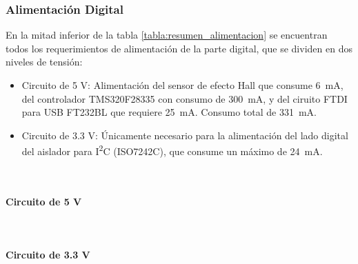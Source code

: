 \subsubsection{Alimentación Digital}

En la mitad inferior de la tabla \ref{tabla:resumen_alimentacion} se encuentran todos los requerimientos de alimentación de la parte digital, que se dividen en dos niveles de tensión:\\

\begin{itemize}
    \item {\SemiBold Circuito de 5 V:} Alimentación del sensor de efecto Hall que consume \SI[]{6}[]{\milli\ampere}, del controlador TMS320F28335 con consumo de \SI[]{300}[]{\milli\ampere}, y del ciruito FTDI para USB FT232BL que requiere \SI[]{25}[]{\milli\ampere}. Consumo total de \SI[]{331}[]{\milli\ampere}. 
    \item {\SemiBold Circuito de 3.3 V:} Únicamente necesario para la alimentación del lado digital del aislador para I\textsuperscript{2}C (ISO7242C), que consume un máximo de \SI[]{24}[]{\milli\ampere}.\\
\end{itemize}

\lipsum[1]\\

\paragraph{Circuito de 5 V}

\lipsum[2]\\

\paragraph{Circuito de 3.3 V}

\lipsum[3]\\